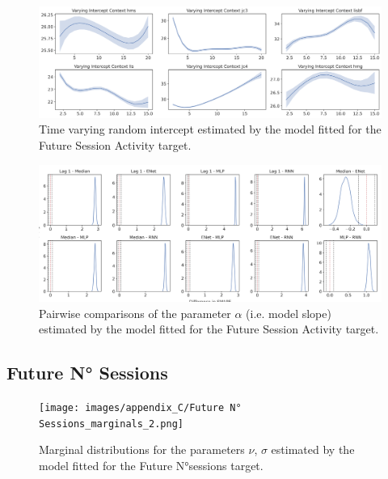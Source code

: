 \begin{figure}[H]
\centering
\includegraphics[width=\textwidth]{images/appendix_C/dafaq.png}
\caption[\textbf{Future session activity time-varying random intercept}]{Time varying random intercept estimated by the model fitted for the Future Session Activity target.}
\label{interc_acti_2}
\end{figure}

\begin{figure}[H]
\centering
\includegraphics[width=\textwidth]{images/appendix_C/Future_Session_Activity_comp_2.png}
\caption[\textbf{Future session activity pairwise comparisons of model fixed effect}]{Pairwise comparisons of the parameter $\alpha$ (i.e. model slope) estimated by the model fitted for the Future Session Activity target.}
\label{comp_acti_2}
\end{figure}

\subsection{Future N° Sessions}
\label{future_no_sess_bayes_2}

\begin{figure}[H]
\centering
\texttt{[image: images/appendix\_C/Future N° Sessions\_marginals\_2.png]}
\caption[\textbf{Future N°sessions marginal distributions}]{Marginal distributions for the parameters $\nu$, $\sigma$ estimated by the model fitted for the Future N°sessions target.}
\label{marginals_no_sess_2}
\end{figure}

